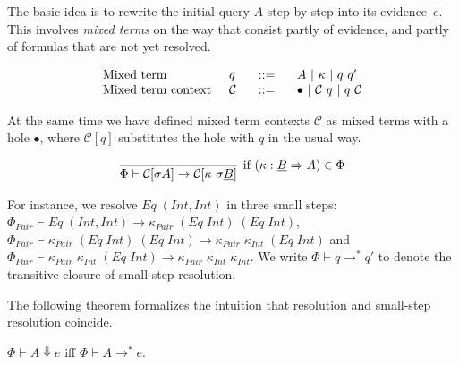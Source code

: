\documentclass{llncs}
\newcommand{\Conid}[1]{\mathit{#1}}
\newcommand{\Varid}[1]{\mathit{#1}}
\begin{document}
The basic idea is to rewrite the initial query $A$ step by step into its
evidence~$e$. This involves \emph{mixed terms} on the way that consist partly
of evidence, and partly of formulas that are not yet resolved.
\begin{definition}
{\small
\[\begin{array}{l@{\hspace{5mm}}l@{\hspace{5mm}}c@{\hspace{5mm}}l}
  \text{Mixed term} & q \ & ::= & \ A \ |\ \kappa \ | \ q \ q' \\
  \text{Mixed term context} & \mathcal{C} \ & ::= & \ \bullet \ | \ \mathcal{C}\ q \ | \ q\ \mathcal{C}\\
\end{array}
\]}
\end{definition}
At the same time we have defined mixed term contexts $\mathcal{C}$ as mixed
terms with a hole $\bullet$, where $\mathcal{C}[q]$ substitutes the hole with $q$ in the usual way.



\begin{definition}
\label{context-red}
{\small
\[\begin{array}{c}
  \infer[\text{if}~(\kappa : \underline{B} \Rightarrow A) \in \Phi]
    {\Phi \vdash \mathcal{C}[\sigma A] \rightarrow \mathcal{C}[\kappa~\sigma\underline{B}]}
    {  } 
  \end{array}
\]}
\end{definition}
For instance, we resolve \ensuremath{\Conid{Eq}\;(\Conid{Int},\Conid{Int})} in three small
steps: $\Phi_{\ensuremath{\Conid{Pair}}} \vdash \ensuremath{\Conid{Eq}\;(\Conid{Int},\Conid{Int})} \rightarrow \ensuremath{\kappa_\Varid{Pair}\;(\Conid{Eq}\;\Conid{Int})\;(\Conid{Eq}\;\Conid{Int})}$,
       $\Phi_{\ensuremath{\Conid{Pair}}} \vdash \ensuremath{\kappa_\Varid{Pair}\;(\Conid{Eq}\;\Conid{Int})\;(\Conid{Eq}\;\Conid{Int})} \rightarrow \ensuremath{\kappa_\Varid{Pair}\;\kappa_\Varid{Int}\;(\Conid{Eq}\;\Conid{Int})}$ and
       $\Phi_{\ensuremath{\Conid{Pair}}} \vdash \ensuremath{\kappa_\Varid{Pair}\;\kappa_\Varid{Int}\;(\Conid{Eq}\;\Conid{Int})} \rightarrow \ensuremath{\kappa_\Varid{Pair}\;\kappa_\Varid{Int}\;\kappa_\Varid{Int}}$.
We write  $\Phi \vdash q \to^{*} q'$ to denote the transitive closure of
small-step resolution.





The following theorem formalizes the intuition that resolution and small-step resolution coincide.
\begin{theorem}
\label{func:eq}
 $\Phi \vdash A \Downarrow e$ iff $ \Phi \vdash A \to^* e$.
\end{theorem}
\end{document}
